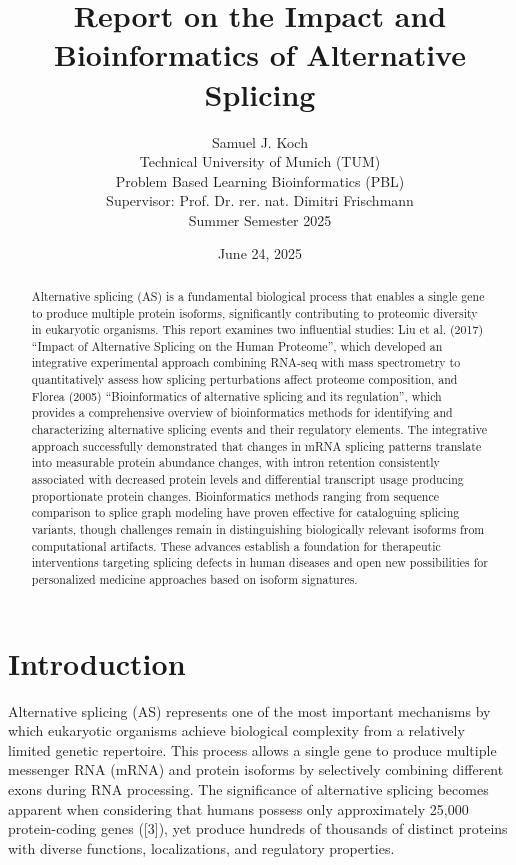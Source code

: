 \documentclass[12pt,a4paper]{article}
\title{Report on the Impact and Bioinformatics of Alternative Splicing}
\author{Samuel J. Koch \\
        Technical University of Munich (TUM) \\
        Problem Based Learning Bioinformatics (PBL) \\
        Supervisor: Prof. Dr. rer. nat. Dimitri Frischmann \\
        Summer Semester 2025}
\date{June 24, 2025}
\begin{document}
\maketitle
\newpage

\tableofcontents
\newpage

\doublespacing

\begin{abstract}
Alternative splicing (AS) is a fundamental biological process that enables a single gene to produce multiple protein isoforms, significantly contributing to proteomic diversity in eukaryotic organisms. This report examines two influential studies: Liu et al. (2017) ``Impact of Alternative Splicing on the Human Proteome'', which developed an integrative experimental approach combining RNA-seq with mass spectrometry to quantitatively assess how splicing perturbations affect proteome composition, and Florea (2005) ``Bioinformatics of alternative splicing and its regulation'', which provides a comprehensive overview of bioinformatics methods for identifying and characterizing alternative splicing events and their regulatory elements. The integrative approach successfully demonstrated that changes in mRNA splicing patterns translate into measurable protein abundance changes, with intron retention consistently associated with decreased protein levels and differential transcript usage producing proportionate protein changes. Bioinformatics methods ranging from sequence comparison to splice graph modeling have proven effective for cataloguing splicing variants, though challenges remain in distinguishing biologically relevant isoforms from computational artifacts. These advances establish a foundation for therapeutic interventions targeting splicing defects in human diseases and open new possibilities for personalized medicine approaches based on isoform signatures.
\end{abstract}

\newpage

\section{Introduction}

Alternative splicing (AS) represents one of the most important mechanisms by which eukaryotic organisms achieve biological complexity from a relatively limited genetic repertoire. This process allows a single gene to produce multiple messenger RNA (mRNA) and protein isoforms by selectively combining different exons during RNA processing. The significance of alternative splicing becomes apparent when considering that humans possess only approximately 25,000 protein-coding genes ([3]), yet produce hundreds of thousands of distinct proteins with diverse functions, localizations, and regulatory properties.
\end{document}
